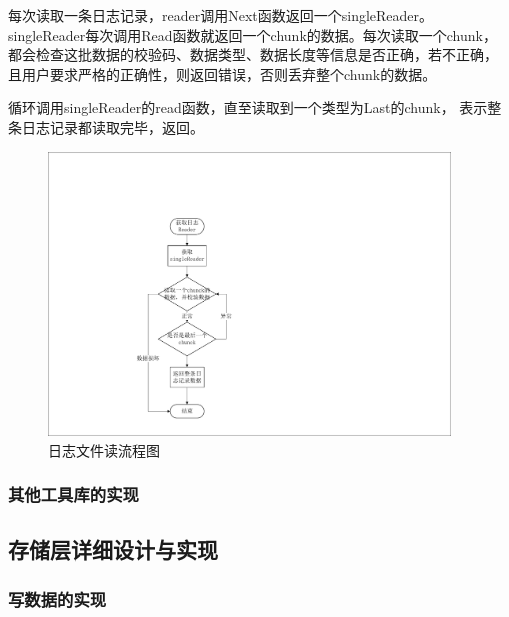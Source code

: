 \begin{enumerate}
		每次读取一条日志记录，reader调用Next函数返回一个singleReader。
		singleReader每次调用Read函数就返回一个chunk的数据。每次读取一个chunk，
		都会检查这批数据的校验码、数据类型、数据长度等信息是否正确，若不正确，
		且用户要求严格的正确性，则返回错误，否则丢弃整个chunk的数据。

		循环调用singleReader的read函数，直至读取到一个类型为Last的chunk，
		表示整条日志记录都读取完毕，返回。

		\begin{figure}[H]
			\centering
			\includegraphics[width=0.95\textwidth]{pdf/journal_read.pdf}
			\caption{日志文件读流程图}
			\label{journal_read}
		\end{figure}
		
		
	
		\end{enumerate}
	
   		\subsubsection{其他工具库的实现}
    


  	\subsection{存储层详细设计与实现}
	
		\subsubsection{写数据的实现}
		
